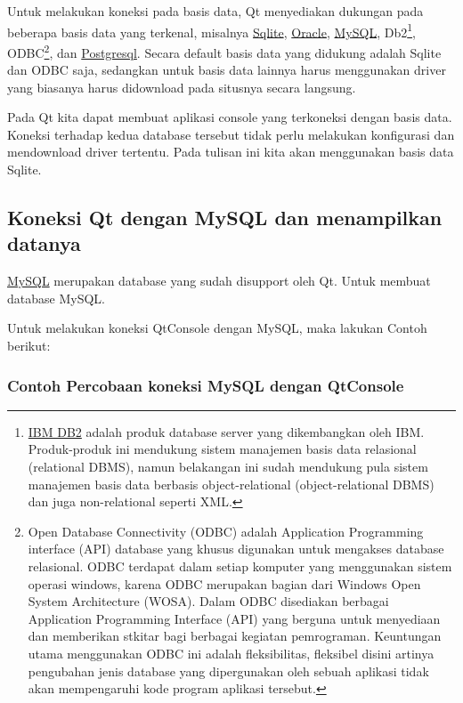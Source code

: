 Untuk melakukan koneksi pada basis data, Qt menyediakan dukungan pada
beberapa basis data yang terkenal, misalnya
\href{https://www.sqlite.org/about.html}{Sqlite},
\href{https://en.wikipedia.org/wiki/Oracle_Database}{Oracle},
\href{https://www.mysql.com/about/}{MySQL}, Db2\footnote{\href{https://en.wikipedia.org/wiki/IBM_DB2}{IBM
DB2} adalah produk database server yang dikembangkan oleh IBM.
Produk-produk ini mendukung sistem manajemen basis data relasional
(relational DBMS), namun belakangan ini sudah mendukung pula sistem
manajemen basis data berbasis object-relational (object-relational
DBMS) dan juga non-relational seperti XML.}, ODBC\footnote{Open
Database Connectivity (ODBC) adalah Application Programming interface
(API) database yang khusus digunakan untuk mengakses database
relasional. ODBC terdapat dalam setiap komputer yang menggunakan
sistem operasi windows, karena ODBC merupakan bagian dari Windows Open
System Architecture (WOSA). Dalam ODBC disediakan berbagai Application
Programming Interface (API) yang berguna untuk menyediaan dan
memberikan stkitar bagi berbagai kegiatan pemrograman. Keuntungan
utama menggunakan ODBC ini adalah fleksibilitas, fleksibel disini
artinya pengubahan jenis database yang dipergunakan oleh sebuah
aplikasi tidak akan mempengaruhi kode program aplikasi tersebut.}, dan
\href{https://id.wikipedia.org/wiki/PostgreSQL}{Postgresql}. Secara
default basis data yang didukung adalah Sqlite dan ODBC saja, sedangkan
untuk basis data lainnya harus menggunakan driver yang biasanya harus
didownload pada situsnya secara langsung.

Pada Qt kita dapat membuat aplikasi console yang terkoneksi dengan basis
data. Koneksi terhadap kedua database tersebut tidak perlu melakukan
konfigurasi dan mendownload driver tertentu. Pada tulisan ini kita akan
menggunakan basis data Sqlite.

\subsection{Koneksi Qt dengan MySQL dan menampilkan
datanya}\label{koneksi-qt-dengan-mysql-dan-menampilkan-datanya}

\href{https://www.mysql.com/}{MySQL} merupakan database yang sudah
disupport oleh Qt. Untuk membuat database MySQL.

Untuk melakukan koneksi QtConsole dengan MySQL, maka lakukan Contoh
berikut:

\subsubsection*{Contoh Percobaan koneksi MySQL dengan QtConsole}

